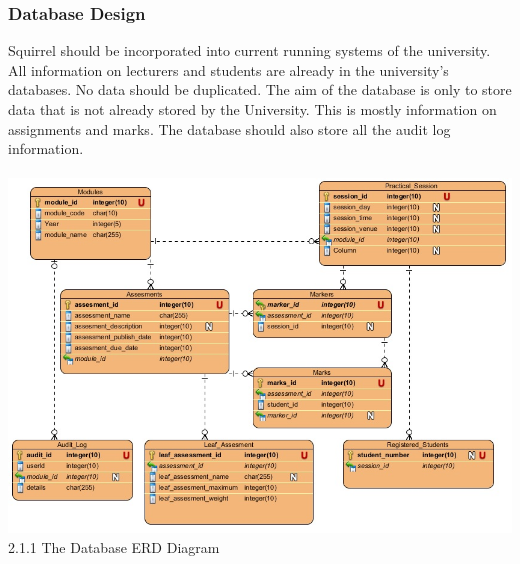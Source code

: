 \documentclass[12pt,a4paper]{article}
\begin{document}
		\subsubsection{Database Design}
		Squirrel should be incorporated into current running systems of the university. All information on lecturers and students are already in the university's databases. No data should be duplicated. The aim of the database is only to store data that is not already stored by the University. This is mostly information on assignments and marks. The database should also store all the audit log information. \\\\
			\includegraphics[scale=0.8]{./DatabaseDiagram/Backend_Database.jpg}
			2.1.1 The Database ERD Diagram\\\\
			\pagebreak
\end{document}

